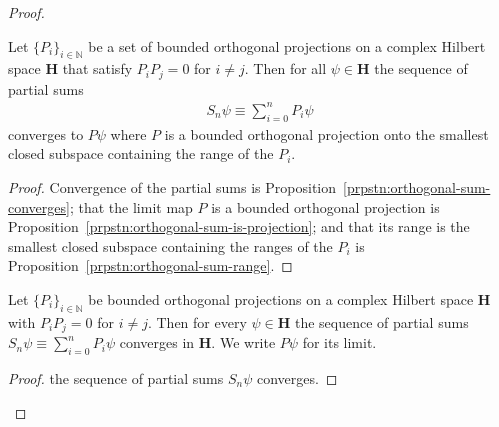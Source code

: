 \begin{proof}
\begin{lemma}
    \label{lmm:lemma-4}
    \leanok
    Let $\{ P_i \}_{i \in \mathbb{N}}$ be a set of bounded orthogonal projections on a complex Hilbert space $\mathbf{H}$ that satisfy $P_iP_j = 0$ for $i \neq j$. Then for all $\psi \in \mathbf{H}$ the sequence of partial sums
    \begin{align}
        S_n\psi \equiv \sum_{i = 0}^n P_i\psi
    \end{align}
    converges to $P\psi$ where $P$ is a bounded orthogonal projection onto the smallest closed subspace containing the range of the $P_i$.
\end{lemma}
\begin{proof}
    \leanok
Convergence of the partial sums is Proposition~\ref{prpstn:orthogonal-sum-converges}; that the limit map $P$ is a bounded orthogonal projection is Proposition~\ref{prpstn:orthogonal-sum-is-projection}; and that its range is the smallest closed subspace containing the ranges of the $P_i$ is Proposition~\ref{prpstn:orthogonal-sum-range}.
\end{proof}

\begin{proposition}
    \label{prpstn:orthogonal-sum-converges}
    \leanok
    Let $\{ P_i \}_{i \in \mathbb{N}}$ be bounded orthogonal projections on a complex Hilbert space $\mathbf{H}$ with $P_iP_j = 0$ for $i \ne j$. Then for every $\psi \in \mathbf{H}$ the sequence of partial sums $S_n\psi \equiv \sum_{i=0}^n P_i\psi$ converges in $\mathbf{H}$. We write $P\psi$ for its limit.
\end{proposition}
\begin{proof}
    \leanok
the sequence of partial sums $S_n\psi$ converges.


\end{proof}
\end{proof}
